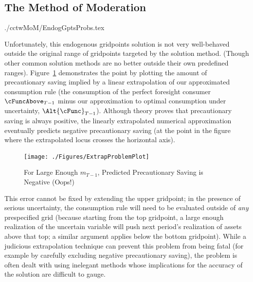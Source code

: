 \documentclass[titlepage, headings=optiontotocandhead]{\econtex}
\begin{document}
\hypertarget{The-Method-of-Moderation}{}
\subsection{The Method of Moderation}

\begin{verbatimwrite}{./cctwMoM/EndogGptsProbs.tex}

  Unfortunately, this endogenous gridpoints solution is not very
  well-behaved outside the original range of gridpoints targeted by
  the solution method.  (Though other common solution methods are no
  better outside their own predefined ranges).
  Figure~\ref{fig:ExtrapProblem} demonstrates the point by plotting
  the amount of precautionary saving implied by a linear extrapolation
  of our approximated consumption rule (the consumption of the perfect
  foresight consumer $\cFuncAbove_{T-1}$ minus our approximation to
  optimal consumption under uncertainty, $\Alt{\cFunc}_{T-1}$).
  Although theory proves that precautionary saving is always positive,
  the linearly extrapolated numerical approximation eventually
  predicts negative precautionary saving (at the point in the figure
  where the extrapolated locus crosses the horizontal axis).

  \hypertarget{ExtrapProblemPlot}{}
  \begin{figure}
    \texttt{[image: ./Figures/ExtrapProblemPlot]}
    \caption{For Large Enough ${m}_{T-1}$, Predicted Precautionary Saving is Negative (Oops!)}
    \label{fig:ExtrapProblem}
  \end{figure}

  This error cannot be fixed by extending the upper gridpoint; in the
  presence of serious uncertainty, the consumption rule will need to be
  evaluated outside of \textit{any} prespecified grid (because starting
  from the top gridpoint, a large enough realization of the uncertain
  variable will push next period's realization of assets above that
  top; a similar argument applies below the bottom gridpoint).  While a judicious extrapolation technique can prevent this
  problem from being fatal (for example by carefully excluding negative
  precautionary saving), the problem is often dealt with using inelegant
  methods whose implications for the accuracy of the solution are
  difficult to gauge.
\end{verbatimwrite}
\unskip
\end{document}
